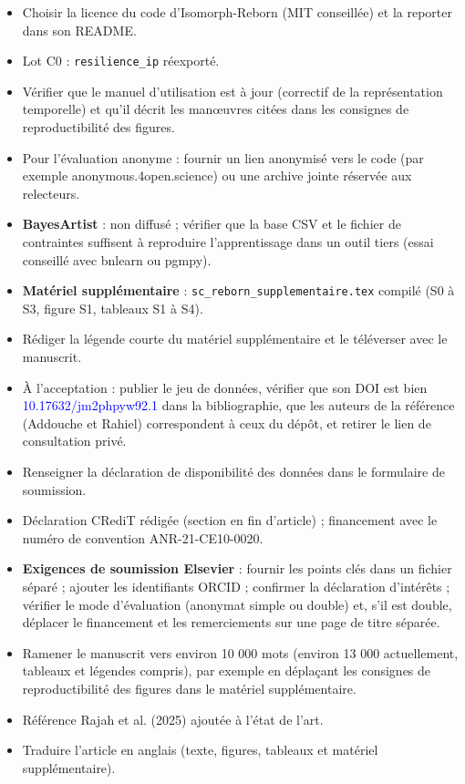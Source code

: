 \documentclass[a4paper,fleqn]{cas-sc}
\newcommand{\acompleter}[1]{\textcolor{blue}{#1}}
\begin{document}
{{{\begin{itemize}[leftmargin=1.2em, itemsep=1pt]
\item[$\square$] Choisir la licence du code d'Isomorph-Reborn (MIT conseillée) et la reporter dans son README.
\item[$\boxtimes$] Lot C0 : \texttt{resilience\_ip} réexporté.
\item[$\square$] Vérifier que le manuel d'utilisation est à jour (correctif de la représentation temporelle) et qu'il décrit les manœuvres citées dans les consignes de reproductibilité des figures.
\item[$\square$] Pour l'évaluation anonyme : fournir un lien anonymisé vers le code (par exemple anonymous.4open.science) ou une archive jointe réservée aux relecteurs.
\item[$\square$] \textbf{BayesArtist} : non diffusé ; vérifier que la base CSV et le fichier de contraintes suffisent à reproduire l'apprentissage dans un outil tiers (essai conseillé avec bnlearn ou pgmpy).
\item[$\boxtimes$] \textbf{Matériel supplémentaire} : \texttt{sc\_reborn\_supplementaire.tex} compilé (S0 à S3, figure S1, tableaux S1 à S4).
\item[$\square$] Rédiger la légende courte du matériel supplémentaire et le téléverser avec le manuscrit.
\item[$\square$] À l'acceptation : publier le jeu de données, vérifier que son DOI est bien \acompleter{10.17632/jm2phpyw92.1} dans la bibliographie, que les auteurs de la référence (Addouche et Rahiel) correspondent à ceux du dépôt, et retirer le lien de consultation privé.
\item[$\square$] Renseigner la déclaration de disponibilité des données dans le formulaire de soumission.
\item[$\boxtimes$] Déclaration CRediT rédigée (section en fin d'article) ; financement avec le numéro de convention ANR-21-CE10-0020.
\item[$\square$] \textbf{Exigences de soumission Elsevier} : fournir les points clés dans un fichier séparé ; ajouter les identifiants ORCID ; confirmer la déclaration d'intérêts ; vérifier le mode d'évaluation (anonymat simple ou double) et, s'il est double, déplacer le financement et les remerciements sur une page de titre séparée.
\item[$\square$] Ramener le manuscrit vers environ 10 000 mots (environ 13 000 actuellement, tableaux et légendes compris), par exemple en déplaçant les consignes de reproductibilité des figures dans le matériel supplémentaire.
\item[$\boxtimes$] Référence Rajah et al. (2025) ajoutée à l'état de l'art.
\item[$\square$] Traduire l'article en anglais (texte, figures, tableaux et matériel supplémentaire).
\end{itemize}}}}
\end{document}
